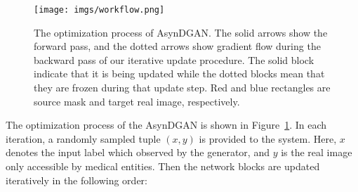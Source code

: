 \begin{figure}[t]
	\vspace{-2em}
	\begin{center}
		\texttt{[image: imgs/workflow.png]}
	\end{center}
	\caption{The optimization process of AsynDGAN. The solid arrows show the forward pass, and the dotted arrows show gradient flow during the backward pass of our iterative update procedure. The solid block indicate that it is being updated while the dotted blocks mean that they are frozen during that update step. Red and blue rectangles are source mask and target real image, respectively.}
	\label{workflow}
\end{figure}


The optimization process of the AsynDGAN is shown in Figure~\ref{workflow}. In each iteration, a randomly sampled tuple $(x, y)$ is provided to the system. Here, $x$ denotes the input label which observed by the generator, and $y$ is the real image only accessible by medical entities. Then the network blocks are updated iteratively in the following order:

